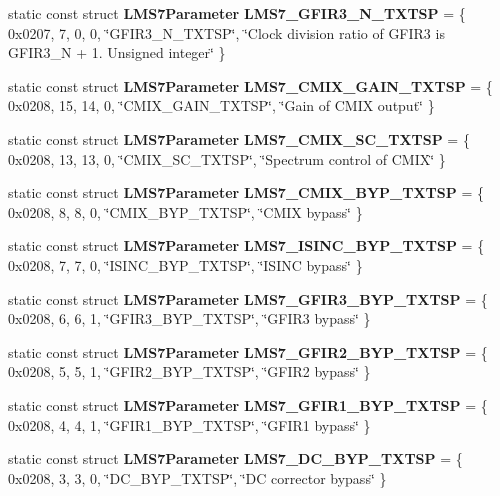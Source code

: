 \begin{DoxyCompactItemize}
\item 
static const struct {\bf L\+M\+S7\+Parameter} {\bf L\+M\+S7\+\_\+\+G\+F\+I\+R3\+\_\+\+N\+\_\+\+T\+X\+T\+SP} = \{ 0x0207, 7, 0, 0, \char`\"{}\+G\+F\+I\+R3\+\_\+\+N\+\_\+\+T\+X\+T\+S\+P\char`\"{}, \char`\"{}\+Clock division ratio of G\+F\+I\+R3 is G\+F\+I\+R3\+\_\+\+N + 1. Unsigned integer\char`\"{} \}
\item 
static const struct {\bf L\+M\+S7\+Parameter} {\bf L\+M\+S7\+\_\+\+C\+M\+I\+X\+\_\+\+G\+A\+I\+N\+\_\+\+T\+X\+T\+SP} = \{ 0x0208, 15, 14, 0, \char`\"{}\+C\+M\+I\+X\+\_\+\+G\+A\+I\+N\+\_\+\+T\+X\+T\+S\+P\char`\"{}, \char`\"{}\+Gain of C\+M\+I\+X output\char`\"{} \}
\item 
static const struct {\bf L\+M\+S7\+Parameter} {\bf L\+M\+S7\+\_\+\+C\+M\+I\+X\+\_\+\+S\+C\+\_\+\+T\+X\+T\+SP} = \{ 0x0208, 13, 13, 0, \char`\"{}\+C\+M\+I\+X\+\_\+\+S\+C\+\_\+\+T\+X\+T\+S\+P\char`\"{}, \char`\"{}\+Spectrum control of C\+M\+I\+X\char`\"{} \}
\item 
static const struct {\bf L\+M\+S7\+Parameter} {\bf L\+M\+S7\+\_\+\+C\+M\+I\+X\+\_\+\+B\+Y\+P\+\_\+\+T\+X\+T\+SP} = \{ 0x0208, 8, 8, 0, \char`\"{}\+C\+M\+I\+X\+\_\+\+B\+Y\+P\+\_\+\+T\+X\+T\+S\+P\char`\"{}, \char`\"{}\+C\+M\+I\+X bypass\char`\"{} \}
\item 
static const struct {\bf L\+M\+S7\+Parameter} {\bf L\+M\+S7\+\_\+\+I\+S\+I\+N\+C\+\_\+\+B\+Y\+P\+\_\+\+T\+X\+T\+SP} = \{ 0x0208, 7, 7, 0, \char`\"{}\+I\+S\+I\+N\+C\+\_\+\+B\+Y\+P\+\_\+\+T\+X\+T\+S\+P\char`\"{}, \char`\"{}\+I\+S\+I\+N\+C bypass\char`\"{} \}
\item 
static const struct {\bf L\+M\+S7\+Parameter} {\bf L\+M\+S7\+\_\+\+G\+F\+I\+R3\+\_\+\+B\+Y\+P\+\_\+\+T\+X\+T\+SP} = \{ 0x0208, 6, 6, 1, \char`\"{}\+G\+F\+I\+R3\+\_\+\+B\+Y\+P\+\_\+\+T\+X\+T\+S\+P\char`\"{}, \char`\"{}\+G\+F\+I\+R3 bypass\char`\"{} \}
\item 
static const struct {\bf L\+M\+S7\+Parameter} {\bf L\+M\+S7\+\_\+\+G\+F\+I\+R2\+\_\+\+B\+Y\+P\+\_\+\+T\+X\+T\+SP} = \{ 0x0208, 5, 5, 1, \char`\"{}\+G\+F\+I\+R2\+\_\+\+B\+Y\+P\+\_\+\+T\+X\+T\+S\+P\char`\"{}, \char`\"{}\+G\+F\+I\+R2 bypass\char`\"{} \}
\item 
static const struct {\bf L\+M\+S7\+Parameter} {\bf L\+M\+S7\+\_\+\+G\+F\+I\+R1\+\_\+\+B\+Y\+P\+\_\+\+T\+X\+T\+SP} = \{ 0x0208, 4, 4, 1, \char`\"{}\+G\+F\+I\+R1\+\_\+\+B\+Y\+P\+\_\+\+T\+X\+T\+S\+P\char`\"{}, \char`\"{}\+G\+F\+I\+R1 bypass\char`\"{} \}
\item 
static const struct {\bf L\+M\+S7\+Parameter} {\bf L\+M\+S7\+\_\+\+D\+C\+\_\+\+B\+Y\+P\+\_\+\+T\+X\+T\+SP} = \{ 0x0208, 3, 3, 0, \char`\"{}\+D\+C\+\_\+\+B\+Y\+P\+\_\+\+T\+X\+T\+S\+P\char`\"{}, \char`\"{}\+D\+C corrector bypass\char`\"{} \}

\end{DoxyCompactItemize}
